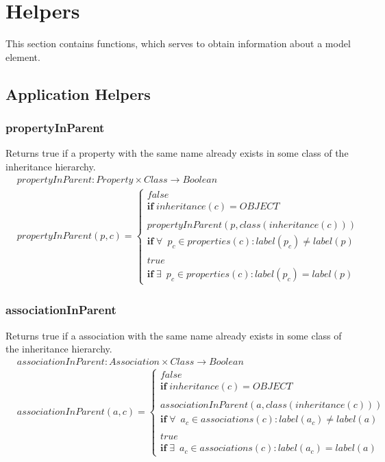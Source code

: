 \documentclass[10pt]{article}
\begin{document}
\section{Helpers}
This section contains functions, which serves to obtain information about a model element.
\subsection{Application Helpers}

\subsubsection{propertyInParent}
Returns true if a property with the same name already exists in some class of the inheritance hierarchy.
\begin{align}
& propertyInParent: Property \times Class \rightarrow Boolean \\
& propertyInParent(p, c) = \begin{cases}
 false \\
 \mathbf{if} \; inheritance(c) = OBJECT \\ \\
 propertyInParent(p, class(inheritance(c))) \\
 \mathbf{if} \; \forall \: \; p_c \in properties(c) : label(p_c) \neq label(p) \\ \\
 true \\
 \mathbf{if} \; \exists \:  \; p_c \in properties(c) : label(p_c) = label(p) 
 \end{cases}
\end{align}

\subsubsection{associationInParent}
Returns true if a association with the same name already exists in some class of the inheritance hierarchy.
\begin{align}
& associationInParent: Association \times Class \rightarrow Boolean \\
& associationInParent(a, c) = \begin{cases}
 false \\
 \mathbf{if} \; inheritance(c) = OBJECT \\ \\
 associationInParent(a, class(inheritance(c))) \\
 \mathbf{if} \; \forall \: \; a_c \in associations(c) : label(a_c) \neq label(a) \\ \\
 true \\
 \mathbf{if} \; \exists \:  \; a_c \in associations(c) : label(a_c) = label(a) 
 \end{cases}
\end{align}
\end{document}
